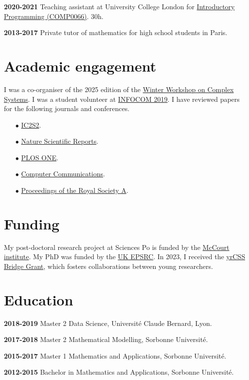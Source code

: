 \documentclass[a4paper,12pt]{article}
\begin{document}
\textbf{2020-2021} Teaching assistant at University College London for \href{https://www.ucl.ac.uk/module-catalogue/modules/introductory-programming/COMP0066}{Introductory Programming (COMP0066)}. 30h.

\textbf{2013-2017} Private tutor of mathematics for high school students in Paris.

\section*{Academic engagement}
I was a co-organiser of the 2025 edition of the \href{https://wwcs2025.github.io/}{Winter Workshop on Complex Systems}. I was a student volunteer at \href{https://infocom2019.ieee-infocom.org/index.html}{INFOCOM 2019}. I have reviewed papers for the following journals and conferences.
\begin{itemize}
  \item[$\bullet$] \href{https://www.ic2s2-2025.org/}{IC2S2}.%
	\item[$\bullet$] \href{https://www.nature.com/srep/}{Nature Scientific Reports}.%
	\item[$\bullet$] \href{https://journals.plos.org/plosone/}{PLOS ONE}.%
	\item[$\bullet$] \href{https://www.journals.elsevier.com/computer-communications}{Computer Communications}.%
	\item[$\bullet$] \href{https://royalsocietypublishing.org/journal/rspa}{Proceedings of the Royal Society A}.%
\end{itemize}

\section*{Funding}
My post-doctoral research project at Sciences Po is funded by the \href{https://www.sciencespo.fr/nous-soutenir/fr/nos-projets/developper-la-recherche/project-liberty-s-institute-mc-court-institute/}{McCourt institute}. My PhD was funded by the \href{https://www.ukri.org/councils/epsrc/}{UK EPSRC}. In 2023, I received the \href{http://yrcss.cssociety.org/bridge-grants/}{yrCSS Bridge Grant}, which fosters collaborations between young researchers.

\section*{Education}
\textbf{2018-2019} Master 2 Data Science, Université Claude Bernard, Lyon.

\textbf{2017-2018} Master 2 Mathematical Modelling, Sorbonne Université.

\textbf{2015-2017} Master 1 Mathematics and Applications, Sorbonne Université.

\textbf{2012-2015} Bachelor in Mathematics and Applications, Sorbonne Université.%


\thispagestyle{empty} %
\end{document}
